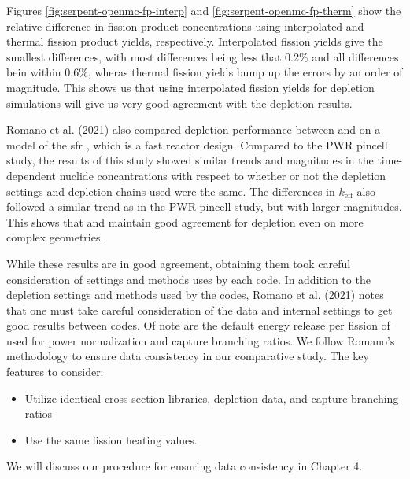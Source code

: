 Figures \ref{fig:serpent-openmc-fp-interp} and
\ref{fig:serpent-openmc-fp-therm} show the relative difference in fission
product concentrations using interpolated and thermal fission product yields,
respectively. Interpolated fission yields give the smallest differences, with
most differences being less that 0.2\% and all differences bein within 0.6\%,
wheras thermal fission yields bump up the errors by an order of magnitude. This
shows us that using interpolated fission yields for \OpenMC depletion
simulations will give us very good agreement with the \SerpentTWO depletion
results.

Romano et al. (2021) also compared depletion performance between \OpenMC and
\SerpentTWO on a model of the \Gls{sfr} \cite{oecd_benchmark_2016}, which is a
fast reactor design. Compared to the PWR pincell study, the results of this
study showed similar trends and magnitudes in the time-dependent nuclide
concantrations with respect to whether or not the depletion settings and
depletion chains used were the same. The differences in $k_\text{eff}$ also
followed a similar trend as in the PWR pincell study, but with larger
magnitudes. This shows that \OpenMC and \SerpentTWO maintain good agreement for
depletion even on more complex geometries.

While these results are in good agreement, obtaining them took careful
consideration of settings and methods uses by each code. In addition to the
depletion settings and methods used by the codes,  Romano et al. (2021) notes
that one must take careful consideration of the data and internal settings to
get good results between codes. Of note are the default energy release per
fission of  used for power normalization and capture branching
ratios. We follow Romano's methodology to ensure data consistency in our
comparative study. The key features to consider:
\begin{itemize}
    \item Utilize identical cross-section libraries, depletion data, and capture
    branching ratios
    \item Use the same fission heating values.
\end{itemize}
We will discuss our procedure for ensuring data consistency in Chapter 4.
